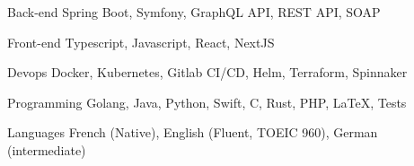 

\begin{cvskills}

\cvskill
  {Back-end} %
  {Spring Boot, Symfony, GraphQL API, REST API, SOAP} %

  \cvskill
    {Front-end} %
    {Typescript, Javascript, React, NextJS} %

  \cvskill
    {Devops} %
    {Docker, Kubernetes, Gitlab CI/CD, Helm, Terraform, Spinnaker} %

  \cvskill
    {Programming} %
    {Golang, Java, Python, Swift, C, Rust, PHP, LaTeX, Tests} %

  \cvskill
    {Languages} %
    {French (Native), English (Fluent, TOEIC 960), German (intermediate)} %

\end{cvskills}
